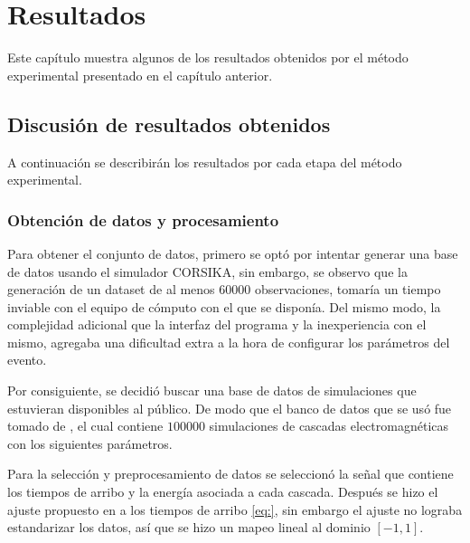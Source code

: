 
\chapter{Resultados} %

\label{Chapter5} %


Este capítulo muestra algunos de los resultados obtenidos por el método experimental presentado en el capítulo anterior.

\section{Discusión de resultados obtenidos}

A continuación se describirán los resultados por cada etapa del método experimental.

\subsection*{Obtención de datos y procesamiento}

Para obtener el conjunto de datos, primero se optó por intentar generar una base de datos usando el simulador CORSIKA, sin embargo, se observo que la generación de un dataset de al menos $60000$ observaciones, tomaría un tiempo inviable con el equipo de cómputo con el que se disponía. Del mismo modo, la complejidad adicional que la interfaz del programa y la inexperiencia con el mismo, agregaba una dificultad extra a la hora de configurar los parámetros del evento. 

Por consiguiente, se decidió buscar una base de datos de simulaciones que estuvieran disponibles al público. De modo que el banco de datos que se usó fue tomado de \parencite{Erdmann2018b}, el cual contiene $100000$ simulaciones de cascadas electromagnéticas con los siguientes parámetros.


Para la selección y preprocesamiento de datos se seleccionó la señal que contiene los tiempos de arribo y la energía asociada a cada cascada. Después se hizo el ajuste propuesto en \parencite{Erdmann2018b} a los tiempos de arribo \ref{eq:}, sin embargo el ajuste no lograba estandarizar los datos, así que se hizo un mapeo lineal al dominio $[-1,1]$.

